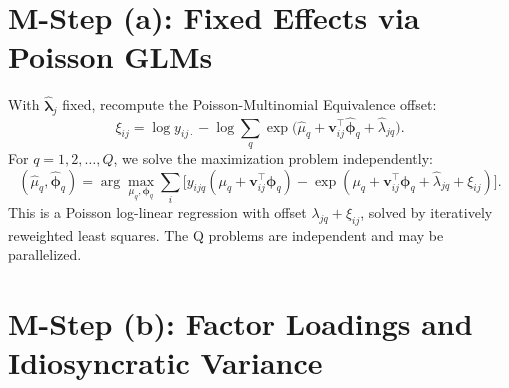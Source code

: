 \documentclass[]{report}
\theoremstyle{definition}
\begin{document}
\section{M-Step (a): Fixed Effects via Poisson GLMs}

    With $\hat{\bm{\lambda}}_{j}$ fixed, recompute the Poisson-Multinomial Equivalence offset:
\begin{equation}
    \xi_{ij}=\log y_{ij\cdot}-\log \sum_{q}\exp\bigl(\hat{\mu}_{q}+\bm{v}_{ij}^{\top}\hat{\bm{\phi}}_{q}+\hat{\lambda}_{jq}\bigr).
\end{equation}
For $q=1,2,\dots,Q$, we solve the maximization problem independently:
    \begin{equation}
        (\hat{\mu}_{q}, \hat{\bm{\phi}}_{q})=\arg \max_{\mu_{q}, \bm{\phi}_{q}}\sum_{i}\bigl[y_{ijq}(\mu_{q}+\bm{v}_{ij}^{\top}\bm{\phi}_{q})-\exp (\mu_{q}+\bm{v}_{ij}^{\top}\bm{\phi}_{q}+\hat{\lambda}_{jq}+\xi_{ij})\bigr].
    \end{equation}
This is a Poisson log-linear regression with offset $\lambda_{jq}+\xi_{ij}$, solved by iteratively reweighted least squares. The Q problems are independent and may be parallelized. 

\section{M-Step (b): Factor Loadings and Idiosyncratic Variance}
\end{document}
